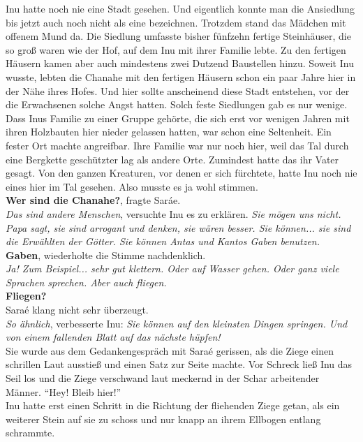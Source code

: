 Inu hatte noch nie eine Stadt gesehen. Und eigentlich konnte man die Ansiedlung bis jetzt auch noch 
nicht als eine bezeichnen. Trotzdem stand das Mädchen mit offenem Mund da. Die Siedlung umfasste 
bisher fünfzehn fertige Steinhäuser, die so groß waren wie der Hof, auf dem Inu mit ihrer Familie 
lebte. Zu den fertigen Häusern kamen aber auch mindestens zwei Dutzend Baustellen hinzu. Soweit Inu 
wusste, lebten die Chanahe mit den fertigen Häusern schon ein paar Jahre hier in der Nähe ihres 
Hofes. Und hier sollte anscheinend diese Stadt entstehen, vor der die Erwachsenen solche Angst 
hatten. Solch feste Siedlungen gab es nur wenige. Dass Inus Familie zu einer Gruppe gehörte, die 
sich erst vor wenigen Jahren mit ihren Holzbauten hier nieder gelassen hatten, war schon eine 
Seltenheit. Ein fester Ort machte angreifbar. Ihre Familie war nur noch hier, weil das Tal durch 
eine Bergkette geschützter lag als andere Orte. Zumindest hatte das ihr Vater gesagt. Von den 
ganzen Kreaturen, vor denen er sich fürchtete, hatte Inu noch nie eines hier im Tal gesehen. Also 
musste es ja wohl stimmen.\\
\textbf{Wer sind die Chanahe?}, fragte Saráe. \\
\textit{Das sind andere Menschen}, versuchte Inu es zu erklären. \textit{Sie mögen uns 
nicht. Papa sagt, sie sind arrogant und denken, sie wären besser. Sie können... sie sind die 
Erwählten der Götter. Sie können Antas und Kantos Gaben benutzen.}\\
\textbf{Gaben}, wiederholte die Stimme nachdenklich.\\
\textit{Ja! Zum Beispiel... sehr gut klettern. Oder auf Wasser gehen. Oder ganz viele Sprachen 
sprechen. Aber auch fliegen.}\\
\textbf{Fliegen?}\\
Saraé klang nicht sehr überzeugt. \\
\textit{So ähnlich}, verbesserte Inu: \textit{Sie können auf den kleinsten Dingen springen. Und von 
einem fallenden Blatt auf das nächste hüpfen!}\\
Sie wurde aus dem Gedankengespräch mit Saraé gerissen, als die Ziege einen schrillen Laut ausstieß 
und einen Satz zur Seite machte. Vor Schreck ließ Inu das Seil los und die Ziege verschwand laut 
meckernd in der Schar arbeitender Männer. ``Hey! Bleib hier!''\\
Inu hatte erst einen Schritt in die Richtung der fliehenden Ziege getan, als ein weiterer Stein auf 
sie zu schoss und nur knapp an ihrem Ellbogen entlang schrammte. \\

